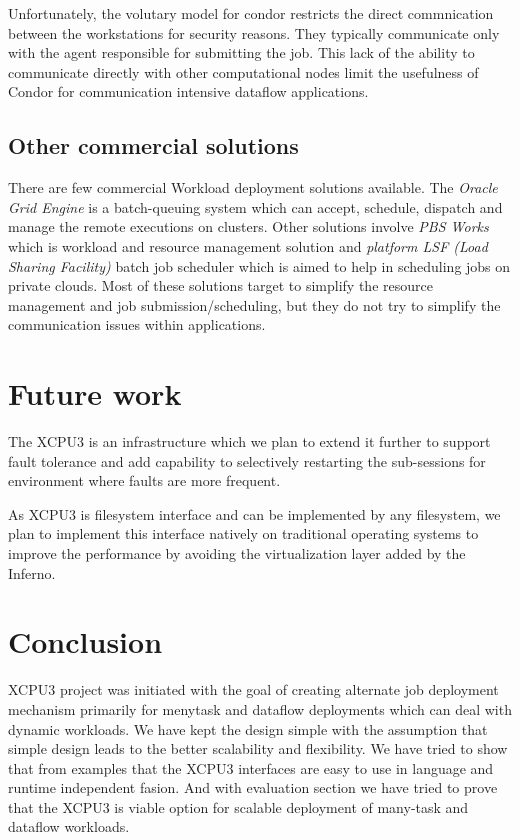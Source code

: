 \documentclass[conference]{IEEEtran}
\begin{document}
Unfortunately, the volutary model for condor restricts the direct commnication
between the workstations for security reasons.  They typically communicate
only with the agent responsible for submitting the job.  This lack of the
ability to communicate directly with other computational nodes limit the
usefulness of Condor for communication intensive dataflow applications.

\subsection{Other commercial solutions}
There are few commercial Workload deployment solutions available.  The
\textit{Oracle Grid Engine}\cite{oge} is a batch-queuing system which can
accept, schedule, dispatch and manage the remote executions on clusters. 
Other solutions involve \textit{PBS Works}\cite{pbsworks} which is workload
and resource management solution and \textit{platform LSF (Load Sharing
Facility)}\cite{platformLSF} batch job scheduler which is aimed to help in
scheduling jobs on private clouds.  Most of these solutions target to simplify
the resource management and job submission/scheduling, but they do not try to
simplify the communication issues within applications.

\section{Future work}
The XCPU3 is an infrastructure which we plan to extend it further to support
fault tolerance and add capability to selectively restarting the sub-sessions
for environment where faults are more frequent.

As XCPU3 is filesystem interface and can be implemented by any filesystem, we
plan to implement this interface natively on traditional operating systems to
improve the performance by avoiding the virtualization layer added by the
Inferno.

\section{Conclusion}
XCPU3 project was initiated with the goal of creating alternate job deployment
mechanism primarily for menytask and dataflow deployments which can deal with
dynamic workloads. We have kept the design simple with the assumption that
simple design leads to the better scalability and flexibility.  We have tried
to show that from examples that the XCPU3 interfaces are easy to use in
language and runtime independent fasion. And with evaluation section we have
tried to prove that the XCPU3 is viable option for scalable deployment of
many-task and dataflow workloads.



\end{document}
